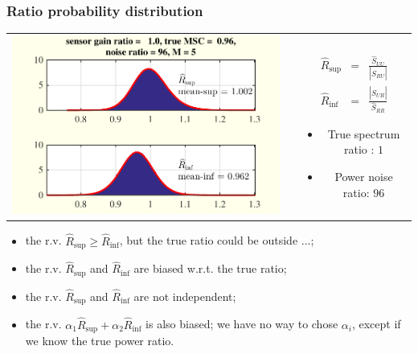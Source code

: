 \documentclass[handout,9pt]{beamer}
\begin{document}
\def\hat{\widehat}
\begin{frame}\frametitle{Ratio probability distribution}
\begin{tabular}{ccc}
\begin{minipage}{6cm}
\centering\includegraphics[scale=0.6]{theoreticaldistribratios.pdf}
\end{minipage}
&&
\begin{minipage}{4cm}
\begin{eqnarray*}
\hat{R}_{\sup}&=&\frac{\hat{S}_{UU}}{|\hat{S}_{RU}|}
\\
\hat{R}_{\inf}&=&\frac{|\hat{S}_{UR}|}{\hat{S}_{RR}}
\end{eqnarray*}
\begin{itemize}
\item
True spectrum ratio : $1$
\item
Power noise ratio: $96$
\end{itemize}
\end{minipage}
\end{tabular}



\begin{itemize}
\item
the r.v. $\hat{R}_{\sup}\geq \hat{R}_{\inf}$, but the true ratio could be outside ...;
 \item
the r.v. $\hat{R}_{\sup}$ and $\hat{R}_{\inf}$ are biased w.r.t. the true ratio;
\item
the r.v. $\hat{R}_{\sup}$ and $\hat{R}_{\inf}$ are not independent;
\item
the r.v. $\alpha_{1}\hat{R}_{\sup}+\alpha_{2} \hat{R}_{\inf}$ is also biased; we have no way to chose $\alpha_{i}$, except if we know the true power ratio.
\end{itemize}
\end{frame}
\end{document}
